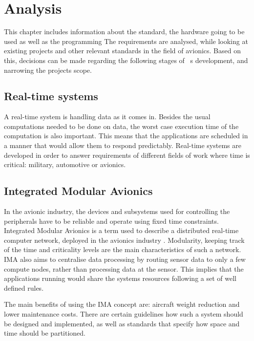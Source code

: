 
\chapter{Analysis}\label{chap:analysis}
This chapter includes information about
the standard, the hardware going to be used as well as the programming
The \arinc{} requirements are analysed, while looking at existing projects
and other relevant standards in the field of avionics. Based on this,
decisions can be made regarding the following stages of \OSname\ \textquotesingle s
development, and narrowing the project\textquotesingle s
scope.

\section{Real-time systems}
A real-time system is handling data as it comes in.
Besides the usual computations needed to be done on data,
the worst case execution time of the computation is also important.
This means that the applications are scheduled in a manner
that would allow them to respond predictably.
Real-time systems are developed in order to answer
requirements of different fields of work
where time is critical: military, automotive or avionics.

\section{Integrated Modular Avionics}
In the avionic industry, the devices and subsystems used for
controlling the peripherals have to be reliable and operate using
fixed time constraints. Integrated Modular Avionics is a term used
to describe a distributed real-time computer network,
deployed in the avionics industry \cite{ima_description}.
Modularity, keeping track of the time and criticality levels are
the main characteristics of such a network. IMA also aims to centralise data 
processing by routing sensor data to only a few compute nodes, rather than
processing data at the sensor. This implies that the applications running would 
share the system\textquotesingle s resources following a set of well defined 
rules.

The main benefits of using the IMA concept are: aircraft weight reduction\cite{boeing_weight_reduction}
and lower maintenance costs\cite{arinc_scarlett}.
There are certain guidelines how such a system
should be designed and implemented, as well as standards that specify
how space and time should be partitioned.

